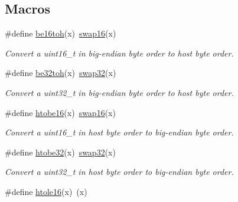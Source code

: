 \subsection*{Macros}
\begin{DoxyCompactItemize}
\item 
\hypertarget{group__util__byteorder_gabb9b3120f6457dc04471c134fee1d221}{\#define \hyperlink{group__util__byteorder_gabb9b3120f6457dc04471c134fee1d221}{be16toh}(x)~\hyperlink{group__util__byteorder_ga7cf3526e1af5c8642d2ec02caecf99bc}{swap16}(x)}\label{group__util__byteorder_gabb9b3120f6457dc04471c134fee1d221}

\begin{DoxyCompactList}\small\item\em Convert a uint16\-\_\-t in big-\/endian byte order to host byte order. \end{DoxyCompactList}\item 
\hypertarget{group__util__byteorder_ga6acac399720b3a57d9050420aa0aac41}{\#define \hyperlink{group__util__byteorder_ga6acac399720b3a57d9050420aa0aac41}{be32toh}(x)~\hyperlink{group__util__byteorder_ga5bdbc60a02db00841f567d1ade52f877}{swap32}(x)}\label{group__util__byteorder_ga6acac399720b3a57d9050420aa0aac41}

\begin{DoxyCompactList}\small\item\em Convert a uint32\-\_\-t in big-\/endian byte order to host byte order. \end{DoxyCompactList}\item 
\hypertarget{group__util__byteorder_ga4b9167199621b390f82c3e5361ba6df6}{\#define \hyperlink{group__util__byteorder_ga4b9167199621b390f82c3e5361ba6df6}{htobe16}(x)~\hyperlink{group__util__byteorder_ga7cf3526e1af5c8642d2ec02caecf99bc}{swap16}(x)}\label{group__util__byteorder_ga4b9167199621b390f82c3e5361ba6df6}

\begin{DoxyCompactList}\small\item\em Convert a uint16\-\_\-t in host byte order to big-\/endian byte order. \end{DoxyCompactList}\item 
\hypertarget{group__util__byteorder_gaa65407014913309932b9a5ea3c16a86d}{\#define \hyperlink{group__util__byteorder_gaa65407014913309932b9a5ea3c16a86d}{htobe32}(x)~\hyperlink{group__util__byteorder_ga5bdbc60a02db00841f567d1ade52f877}{swap32}(x)}\label{group__util__byteorder_gaa65407014913309932b9a5ea3c16a86d}

\begin{DoxyCompactList}\small\item\em Convert a uint32\-\_\-t in host byte order to big-\/endian byte order. \end{DoxyCompactList}\item 
\hypertarget{group__util__byteorder_ga3ea73a6089f61223b225c46e2ba58a47}{\#define \hyperlink{group__util__byteorder_ga3ea73a6089f61223b225c46e2ba58a47}{htole16}(x)~(x)}\label{group__util__byteorder_ga3ea73a6089f61223b225c46e2ba58a47}


\end{DoxyCompactItemize}
